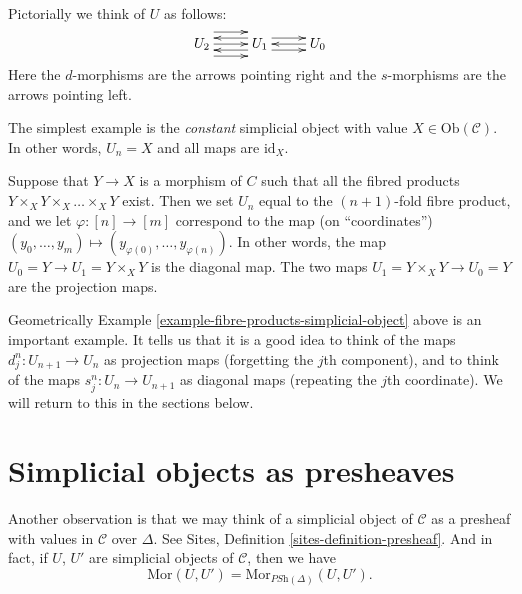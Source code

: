 \medskip\noindent
Pictorially we think of $U$ as follows:
$$
\xymatrix{
U_2
\ar@<2ex>[r]
\ar@<0ex>[r]
\ar@<-2ex>[r]
&
U_1 
\ar@<1ex>[r]
\ar@<-1ex>[r]
\ar@<1ex>[l]
\ar@<-1ex>[l]
&
U_0
\ar@<0ex>[l]
}
$$
Here the $d$-morphisms are the arrows pointing right and the 
$s$-morphisms are the arrows pointing left.

\begin{example}
\label{example-constant-simplicial-object}
The simplest example is the {\it constant} simplicial object with
value $X \in \text{Ob}(\mathcal{C})$. In other words, $U_n=X$ and
all maps are $\text{id}_X$.
\end{example}

\begin{example}
\label{example-fibre-products-simplicial-object}
Suppose that $Y\to X$ is a morphism of $C$ such that all
the fibred products $Y\times_X Y \times_X \ldots \times_X Y$ exist.
Then we set $U_n$ equal to the $(n + 1)$-fold fibre product,
and we let $\varphi: [n] \to [m]$ correspond to the map
(on ``coordinates'')
$(y_0,\ldots, y_m) \mapsto (y_{\varphi(0)},\ldots, y_{\varphi(n)})$.
In other words, the map $U_0 = Y \to U_1 = Y\times_X Y$ is the
diagonal map. The two maps $U_1 = Y\times_X Y \to U_0 = Y$ are the
projection maps.
\end{example}

\noindent
Geometrically Example \ref{example-fibre-products-simplicial-object}
above is an important example. It tells us that it is a good
idea to think of the maps $d^n_j : U_{n + 1} \to U_n$
as projection maps (forgetting the $j$th component),
and to think of the maps $s^n_j : U_n \to U_{n + 1}$
as diagonal maps (repeating the $j$th coordinate).
We will return to this in the sections below.

\section{Simplicial objects as presheaves}
\label{section-simplicial-presheaves}

\noindent
Another observation is that we may think of a simplicial
object of $\mathcal{C}$ as a presheaf with values in $\mathcal{C}$
over $\Delta$. See
Sites, Definition \ref{sites-definition-presheaf}.
And in fact, if $U$, $U'$ are simplicial objects
of $\mathcal{C}$, then we have
\begin{equation}
\label{simplicial-set-presheaf}
\text{Mor}(U, U') = \text{Mor}_{\textit{PSh}(\Delta)}(U, U').
\end{equation}

